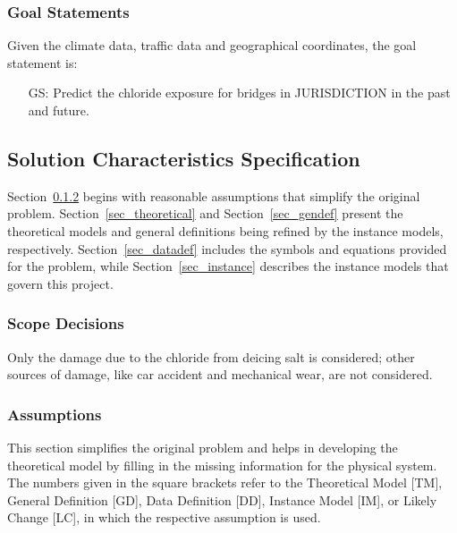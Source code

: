 \documentclass[12pt]{article}
\newcounter{goalnum} %
\begin{document}
\newpage
\subsubsection{Goal Statements}

\noindent Given the climate data, traffic data and geographical coordinates, the goal statement is:

\begin{itemize}

\item[GS\refstepcounter{goalnum}\thegoalnum \label{G_ChlorideExposurePrediction}:] Predict the chloride exposure for bridges in JURISDICTION in the past and future.
\end{itemize}

\subsection{Solution Characteristics Specification}
Section~\ref{sec_assumpt} begins with reasonable assumptions that simplify the original problem. Section~\ref{sec_theoretical} and Section~\ref{sec_gendef} present the theoretical models and general definitions being refined by the instance models, respectively. Section~\ref{sec_datadef} includes the symbols and equations provided for the problem, while Section~\ref{sec_instance} describes the instance models that govern this project.

\subsubsection{Scope Decisions}
Only the damage due to the chloride from deicing salt is considered; other sources of damage, like car accident and mechanical wear, are not considered.

\subsubsection{Assumptions} \label{sec_assumpt}

This section simplifies the original problem and helps in developing the
theoretical model by filling in the missing information for the physical system.
The numbers given in the square brackets refer to the Theoretical Model [TM],
General Definition [GD], Data Definition [DD], Instance Model [IM], or Likely
Change [LC], in which the respective assumption is used.
\end{document}
